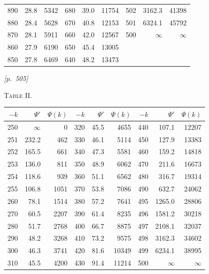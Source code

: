 \documentclass[11pt]{article}
\begin{document}
\begin{center}
\begin{tabular}{|r|r|r||r|r|r||r|r|r|}
890  & 28.8     & 5342    & 680 & 39.0  & 11754 & 502 & 3162.3 & 41398 \\
880  & 28.4     & 5628    & 670 & 40.8  & 12153 & 501 & 6324.1 & 45792 \\
870  & 28.1     & 5911    & 660 & 42.0  & 12567 & 500 & $\infty$ & $\infty$ \\
860  & 27.9     & 6190    & 650 & 45.4  & 13005 &     &        &      \\
850  & 27.8     & 6469    & 640 & 48.2  & 13473 &     &        &      \\
\hline
\end{tabular}
\end{center}

\newpage

\noindent\textit{[p.~505]}

\medskip

\begin{center}\textsc{Table II.}\end{center}

\medskip

\begin{center}
\begin{tabular}{|r|r|r||r|r|r||r|r|r|}
\hline
$-k$ & $\Psi'$ & $\Psi(k)$ & $-k$ & $\Psi'$ & $\Psi(k)$ & $-k$ & $\Psi'$ & $\Psi(k)$ \\ \hline
250 & $\infty$ & 0        & 320 & 45.5  & 4655   & 440 & 107.1  & 12207 \\
251 & 232.2    & 462      & 330 & 46.1  & 5114   & 450 & 127.9  & 13383 \\
252 & 165.5    & 661      & 340 & 47.3  & 5581   & 460 & 159.2  & 14818 \\
253 & 136.0    & 811      & 350 & 48.9  & 6062   & 470 & 211.6  & 16673 \\
254 & 118.6    & 939      & 360 & 51.1  & 6562   & 480 & 316.7  & 19314 \\
255 & 106.8    & 1051     & 370 & 53.8  & 7086   & 490 & 632.7  & 24062 \\
260 & 78.1     & 1514     & 380 & 57.2  & 7641   & 495 & 1265.0 & 28806 \\
270 & 60.5     & 2207     & 390 & 61.4  & 8235   & 496 & 1581.2 & 30218 \\
280 & 51.7     & 2768     & 400 & 66.7  & 8875   & 497 & 2108.1 & 32037 \\
290 & 48.2     & 3268     & 410 & 73.2  & 9575   & 498 & 3162.3 & 34602 \\
300 & 46.3     & 3741     & 420 & 81.6  & 10349  & 499 & 6234.1 & 38995 \\
310 & 45.5     & 4200     & 430 & 91.4  & 11214  & 500 & $\infty$ & $\infty$ \\
\hline
\end{tabular}
\end{center}
\end{document}
